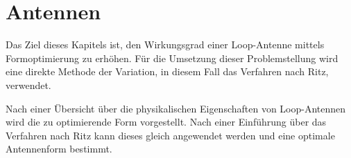 %
%
%
%
\chapter{Antennen\label{chapter:antennen}}
\begin{refsection}

Das Ziel dieses Kapitels ist, den Wirkungsgrad einer Loop-Antenne mittels Formoptimierung zu erhöhen. Für die Umsetzung dieser Problemstellung wird eine direkte Methode der Variation, in diesem Fall das Verfahren nach Ritz, verwendet.

Nach einer Übersicht über die physikalischen Eigenschaften von Loop-Antennen wird die zu optimierende Form vorgestellt. Nach einer Einführung über das Verfahren nach Ritz kann dieses gleich angewendet werden und eine optimale Antennenform bestimmt.








\printbibliography[heading=subbibliography]
\end{refsection}
